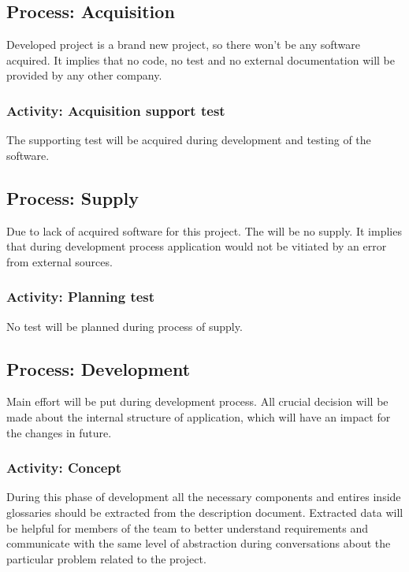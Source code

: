 	\subsection{Process: Acquisition} \label{s:details-of-the-master-test-plan:process-acquisiton}
		Developed project is a brand new project, so there won't be any software acquired. It implies that no code, no test and no external documentation will be provided by any other company. 
		\subsubsection{Activity: Acquisition support test} \label{s:details-of-the-master-test-plan:activitiy-acquisition-support-test} 
		The supporting test will be acquired during development and testing of the software.
	\subsection{Process: Supply} \label{s:details-of-the-master-test-plan:process-supply}
		Due to lack of acquired software for this project. The will be no supply. It implies that during development process application would not be vitiated by an error from external sources.
		\subsubsection{Activity: Planning test} \label{s:details-of-the-master-test-plan:activity-planning-tests}
		No test will be planned during process of supply.
	\subsection{Process: Development} \label{s:details-of-the-master-test-plan:process-development}
		Main effort will be put during development process. All crucial decision will be made about the internal structure of application, which will have an impact for the changes in future.
		\subsubsection{Activity: Concept} \label{s:details-of-the-master-test-plan:activity-concept}
		During this phase of development all the necessary components and entires inside glossaries should be extracted from the description document. Extracted data will be helpful for members of the team to better understand requirements and communicate with the same level of abstraction during conversations about the particular problem related to the project.
